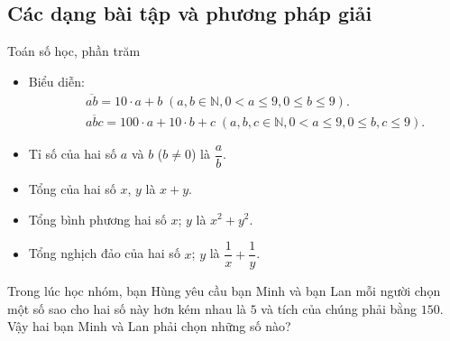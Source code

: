 \subsection{Các dạng bài tập và phương pháp giải}
   \begin{dang}{Toán số học, phần trăm}
   \begin{itemize}
   	\item 	Biểu diễn: 
   	\begin{eqnarray*}
 &&\overline{ab}=10\cdot a+b\; (a,b\in \mathbb{N}, 0<a\leq 9, 0\leq b\leq 9).\\
 &&\overline{abc}=100\cdot a+10\cdot b+c\; (a,b,c \in \mathbb{N}, 0<a\leq 9, 0\leq b,c\leq 9).
   	\end{eqnarray*}
   \item Tỉ số của hai số $a$ và $b$ ($b\neq 0$) là $\dfrac{a}{b}$.
   \item Tổng của hai số $x$, $y$ là $x+y$.
   \item Tổng bình phương hai số $x$; $y$ là $x^2+y^2$.
   \item Tổng nghịch đảo của hai số $x$; $y$ là $\dfrac{1}{x}+\dfrac{1}{y}$.
   \end{itemize}
   	\end{dang}
   \begin{vd}
   	Trong lúc học nhóm, bạn Hùng yêu cầu bạn Minh và bạn Lan mỗi người chọn một số sao cho hai số này hơn kém nhau là $5$ và tích của chúng phải bằng $150$. Vậy hai bạn Minh và Lan phải chọn những số nào?
   \end{vd}
